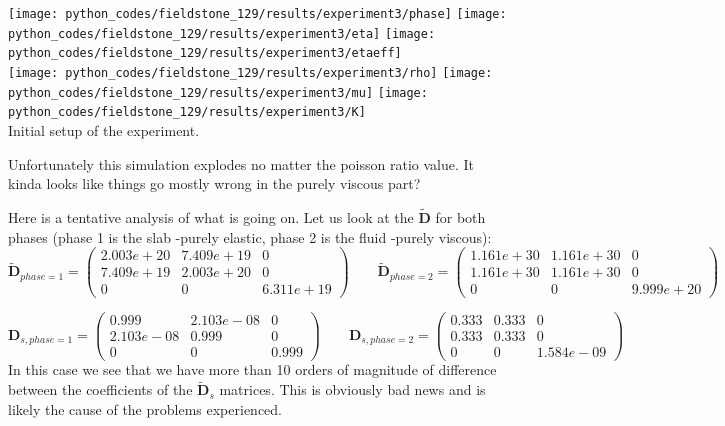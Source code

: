 \begin{center}
\texttt{[image: python\_codes/fieldstone\_129/results/experiment3/phase]}
\texttt{[image: python\_codes/fieldstone\_129/results/experiment3/eta]}
\texttt{[image: python\_codes/fieldstone\_129/results/experiment3/etaeff]}\\
\texttt{[image: python\_codes/fieldstone\_129/results/experiment3/rho]}
\texttt{[image: python\_codes/fieldstone\_129/results/experiment3/mu]}
\texttt{[image: python\_codes/fieldstone\_129/results/experiment3/K]}\\
{\captionfont Initial setup of the experiment.}
\end{center} 

Unfortunately this simulation explodes no matter the poisson ratio value.
It kinda looks like things go mostly wrong in the purely viscous part?

Here is a tentative analysis of what is going on. Let us look at the 
$\tilde{\bm D}$ for both phases (phase 1 is the slab -purely elastic, phase 2 is the fluid -purely viscous):
\[
\tilde{\bm D}_{phase=1} = 
\left(
\begin{array}{ccc}
2.003e+20 &7.409e+19 & 0 \\
7.409e+19  & 2.003e+20 & 0 \\
0 & 0 & 6.311e+19 
\end{array}
\right)
\qquad
\tilde{\bm D}_{phase=2} = 
\left(
\begin{array}{ccc}
1.161e+30 & 1.161e+30 & 0 \\
1.161e+30 & 1.161e+30 & 0 \\
0 & 0 & 9.999e+20
\end{array}
\right)
\]

\[
{\bm D}_{s,phase=1} = 
\left(
\begin{array}{ccc}
0.999    & 2.103e-08 & 0 \\
2.103e-08 & 0.999    & 0 \\
0 & 0 & 0.999
\end{array}
\right)
\qquad
{\bm D}_{s,phase=2} = 
\left(
\begin{array}{ccc}
0.333 & 0.333 & 0 \\ 
0.333 & 0.333 & 0 \\
0 & 0 & 1.584e-09
\end{array}
\right)
\]
In this case we see that we have more than 10 orders of magnitude of 
difference between the coefficients of the $\tilde{\bm D}_s$ matrices.
This is obviously bad news and is likely the cause of the problems
experienced. 


